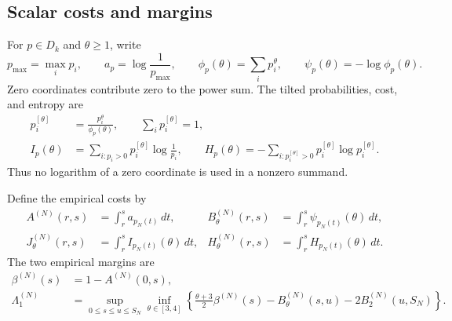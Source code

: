 \documentclass[11pt]{article}
\numberwithin{equation}{section}
\theoremstyle{definition}
\theoremstyle{remark}
\newcommand{\1}{\mathbf 1}
\begin{document}
\subsection{Scalar costs and margins}
\label{subsec:scalar-costs}

For $p\in D_k$ and $\theta\ge1$, write
\[
 p_{\max}=\max_i p_i,\qquad a_p=\log\frac1{p_{\max}},\qquad
 \phi_p(\theta)=\sum_i p_i^\theta,\qquad
 \psi_p(\theta)=-\log\phi_p(\theta).
\]
Zero coordinates contribute zero to the power sum. The tilted
probabilities, cost, and entropy are
\begin{align}%
\label{eq:tilted-costs}
 p_i^{[\theta]}&=\frac{p_i^\theta}{\phi_p(\theta)},\qquad
 \sum_i p_i^{[\theta]}=1,\nonumber\\
 I_p(\theta)&=\sum_{i:p_i>0}p_i^{[\theta]}\log\frac1{p_i},\qquad
 H_p(\theta)=-\sum_{i:p_i^{[\theta]}>0}p_i^{[\theta]}\log p_i^{[\theta]}.
\end{align}
Thus no logarithm of a zero coordinate is used in a nonzero summand.

Define the empirical costs by
\begin{align*}
 A^{(N)}(r,s)&=\int_r^s a_{p_N(t)}\,dt,&
 B^{(N)}_\theta(r,s)&=\int_r^s\psi_{p_N(t)}(\theta)\,dt,\\
 J^{(N)}_\theta(r,s)&=\int_r^s I_{p_N(t)}(\theta)\,dt,&
 H^{(N)}_\theta(r,s)&=\int_r^s H_{p_N(t)}(\theta)\,dt.
\end{align*}
The two empirical margins are
\begin{align}%
\label{eq:empirical-margins}
 \beta^{(N)}(s)&=1-A^{(N)}(0,s),\nonumber\\
 \Lambda_1^{(N)}&=\sup_{0\le s\le u\le S_N}\inf_{\theta\in[3,4]}
 \left\{\frac{\theta+3}{2}\beta^{(N)}(s)
       -B^{(N)}_\theta(s,u)-2B^{(N)}_2(u,S_N)\right\}.
\end{align}
\end{document}
